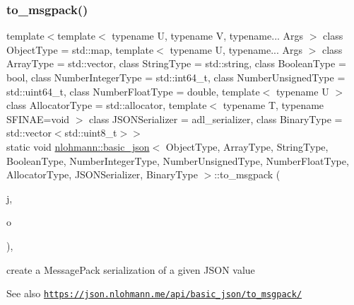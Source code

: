 \subsubsection{\texorpdfstring{to\+\_\+msgpack()}{to\_msgpack()}\hspace{0.1cm}{\footnotesize\ttfamily [2/3]}}
{\footnotesize\ttfamily template$<$template$<$ typename U, typename V, typename... Args $>$ class Object\+Type = std\+::map, template$<$ typename U, typename... Args $>$ class Array\+Type = std\+::vector, class String\+Type  = std\+::string, class Boolean\+Type  = bool, class Number\+Integer\+Type  = std\+::int64\+\_\+t, class Number\+Unsigned\+Type  = std\+::uint64\+\_\+t, class Number\+Float\+Type  = double, template$<$ typename U $>$ class Allocator\+Type = std\+::allocator, template$<$ typename T, typename S\+F\+I\+N\+A\+E=void $>$ class J\+S\+O\+N\+Serializer = adl\+\_\+serializer, class Binary\+Type  = std\+::vector$<$std\+::uint8\+\_\+t$>$$>$ \\
static void \hyperlink{classnlohmann_1_1basic__json}{nlohmann\+::basic\+\_\+json}$<$ Object\+Type, Array\+Type, String\+Type, Boolean\+Type, Number\+Integer\+Type, Number\+Unsigned\+Type, Number\+Float\+Type, Allocator\+Type, J\+S\+O\+N\+Serializer, Binary\+Type $>$\+::to\+\_\+msgpack (\begin{DoxyParamCaption}\item[{const \hyperlink{classnlohmann_1_1basic__json}{basic\+\_\+json}$<$ Object\+Type, Array\+Type, String\+Type, Boolean\+Type, Number\+Integer\+Type, Number\+Unsigned\+Type, Number\+Float\+Type, Allocator\+Type, J\+S\+O\+N\+Serializer, Binary\+Type $>$ \&}]{j,  }\item[{\hyperlink{classnlohmann_1_1detail_1_1output__adapter}{detail\+::output\+\_\+adapter}$<$ std\+::uint8\+\_\+t $>$}]{o }\end{DoxyParamCaption})\hspace{0.3cm}{\ttfamily [inline]}, {\ttfamily [static]}}



create a Message\+Pack serialization of a given J\+S\+ON value 

\begin{DoxySeeAlso}{See also}
\href{https://json.nlohmann.me/api/basic_json/to_msgpack/}{\tt https\+://json.\+nlohmann.\+me/api/basic\+\_\+json/to\+\_\+msgpack/} 
\end{DoxySeeAlso}
\mbox{\label{classnlohmann_1_1basic__json_aca5dc0fca52131f3a634372120abfbe7}} 
